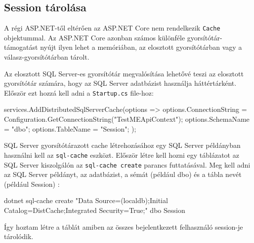 \subsection{Session tárolása}

A régi ASP.NET-től eltérően az ASP.NET Core nem rendelkezik \lstinline{Cache} objektummal. Az ASP.NET Core azonban számos különféle gyorsítótár-támogatást nyújt ilyen lehet a memóriában, az elosztott gyorsítótárban vagy a válasz-gyorsítótárban tárolt. \newline

Az elosztott SQL Server-es gyorsítótár megvalósítása lehetővé teszi az elosztott gyorsítótár számára, hogy az SQL Server adatbázist használja háttértárként. Először ezt hozzá kell adni a \lstinline{Startup.cs} file-hoz:

\begin{cpp}
    services.AddDistributedSqlServerCache(options => {
        options.ConnectionString =
            Configuration.GetConnectionString("TestMEApiContext");
        options.SchemaName = "dbo";
        options.TableName = "Session";
    });
\end{cpp}

SQL Server gyorsítótárazott cache létrehozásához egy SQL Server példányban használni kell az \lstinline{sql-cache} eszközt. Először létre kell hozni egy táblázatot az SQL Server kiszolgálón az \lstinline{sql-cache create} parancs futtatásával. Meg kell adni az SQL Server példányt, az adatbázist, a sémát (például dbo) és a tábla nevét (például Session) \cite{distributedSQLServerCache}:

\begin{cpp}
    dotnet sql-cache create "Data Source=(localdb)\MSSQLLocalDB;Initial
    Catalog=DistCache;Integrated Security=True;" dbo Session
\end{cpp}

Így hoztam létre a táblát amiben az összes bejelentkezett felhasználó session-je tárolódik.
